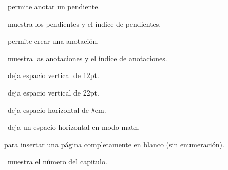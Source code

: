 

\pa\ permite anotar un pendiente.

\ muestra los pendientes y el índice de pendientes.


\pa\ permite crear una anotación.

\ muestra las anotaciones y el índice de anotaciones.


\ deja espacio vertical de 12pt.

\ deja espacio vertical de 22pt.

\pa[\#]\ deja espacio horizontal de \texttt{\#}em.

\ deja un espacio horizontal en modo math.

 para insertar una página completamente en blanco (sin enumeración).


\ muestra el número del capitulo.
